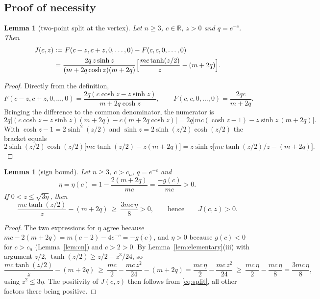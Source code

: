 \documentclass[11pt,a4paper]{article}
\theoremstyle{plain}
\newtheorem{lemma}[theorem]{Lemma}
\theoremstyle{definition}
\newcommand{\R}{\mathbb{R}}
\begin{document}
\subsection{Proof of necessity}

\begin{lemma}[two-point split at the vertex]\label{lem:split}
Let $n\ge 3$, $c\in\R$, $z>0$ and $q=e^{-c}$. Then
\begin{equation}\label{eq:split}
\begin{aligned}
J(c,z)&:=F(c-z,c+z,0,\dots,0)-F(c,c,0,\dots,0)\\
&=\frac{2q\,z\sinh z}{(m+2q\cosh z)(m+2q)}\Bigl[\frac{mc\tanh(z/2)}{z}-(m+2q)\Bigr].
\end{aligned}
\end{equation}
\end{lemma}

\begin{proof}
Directly from the definition,
\[
F(c-z,c+z,0,\dots,0)=\frac{2q(c\cosh z-z\sinh z)}{m+2q\cosh z},\qquad F(c,c,0,\dots,0)=\frac{2qc}{m+2q}.
\]
Bringing the difference to the common denominator, the numerator is
\[
2q\bigl[(c\cosh z-z\sinh z)(m+2q)-c(m+2q\cosh z)\bigr]=2q\bigl[mc(\cosh z-1)-z\sinh z\,(m+2q)\bigr].
\]
With $\cosh z-1=2\sinh^2(z/2)$ and $\sinh z=2\sinh(z/2)\cosh(z/2)$ the bracket equals
\[
2\sinh(z/2)\cosh(z/2)\bigl[mc\tanh(z/2)-z(m+2q)\bigr]=z\sinh z\bigl[mc\tanh(z/2)/z-(m+2q)\bigr].
\]
\end{proof}

\begin{lemma}[sign bound]\label{lem:signbound}
Let $n\ge 3$, $c>c_n$, $q=e^{-c}$ and
\begin{equation}\label{eq:eta}
\eta=\eta(c)=1-\frac{2(m+2q)}{mc}=\frac{-g(c)}{mc}>0 .
\end{equation}
If $0<z\le\sqrt{3\eta}$, then
\begin{equation}\label{eq:signbound}
\frac{mc\tanh(z/2)}{z}-(m+2q)\ \ge\ \frac{3mc\,\eta}{8}>0,\qquad\text{hence}\qquad J(c,z)>0 .
\end{equation}
\end{lemma}

\begin{proof}
The two expressions for $\eta$ agree because $mc-2(m+2q)=m(c-2)-4e^{-c}=-g(c)$, and $\eta>0$ because $g(c)<0$ for $c>c_n$ (Lemma~\ref{lem:cn}) and $c>2>0$. By Lemma~\ref{lem:elementary}(iii) with argument $z/2$, $\tanh(z/2)\ge z/2-z^3/24$, so
\[
\frac{mc\tanh(z/2)}{z}-(m+2q)\ \ge\ \frac{mc}{2}-\frac{mc\,z^2}{24}-(m+2q)=\frac{mc\,\eta}{2}-\frac{mc\,z^2}{24}\ \ge\ \frac{mc\,\eta}{2}-\frac{mc\,\eta}{8}=\frac{3mc\,\eta}{8},
\]
using $z^2\le 3\eta$. The positivity of $J(c,z)$ then follows from \eqref{eq:split}, all other factors there being positive.
\end{proof}
\end{document}
